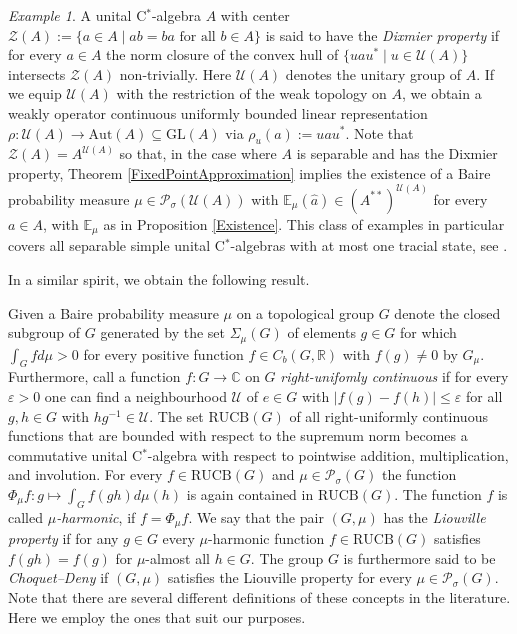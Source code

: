 \documentclass[a4paper,11pt,reqno]{amsart}
\numberwithin{equation}{section}
\theoremstyle{definition}
\theoremstyle{remark}
\newtheorem{example}[theorem]{Example}
\theoremstyle{remark}
\begin{document}
\begin{example} A unital C$^{\ast}$-algebra $A$ with center $\mathcal{Z}(A):=\{a\in A\mid ab=ba\text{ for all }b\in A\}$ is said to have the \emph{Dixmier property} if for every $a\in A$ the norm closure of the convex hull of $\{uau^{\ast}\mid u\in\mathcal{U}(A)\}$ intersects $\mathcal{Z}(A)$ non-trivially. Here $\mathcal{U}(A)$ denotes the unitary group of $A$. If we equip $\mathcal{U}(A)$ with the restriction of the weak topology on $A$, we obtain a weakly operator continuous uniformly bounded linear representation $\rho:\mathcal{U}(A)\rightarrow\text{Aut}(A)\subseteq\text{GL}(A)$ via $\rho_{u}(a):=uau^{\ast}$. Note that $\mathcal{Z}(A)=A^{\mathcal{U}(A)}$ so that, in the case where $A$ is separable and has the Dixmier property, Theorem \ref{FixedPointApproximation} implies the existence of a Baire probability measure $\mu\in\mathcal{P}_{\sigma}(\mathcal{U}(A))$ with $\mathbb{E}_{\mu}(\widehat{a})\in(A^{\ast\ast})^{\mathcal{U}(A)}$ for every $a\in A$, with $\mathbb{E}_{\mu}$ as in Proposition \ref{Existence}. This class of examples in particular covers all separable simple unital C$^{\ast}$-algebras with at most one tracial state, see \cite{HaagerupSzido}. \end{example}

In a similar spirit, we obtain the following result.

Given a Baire probability measure $\mu$ on a topological group $G$ denote the closed subgroup of $G$ generated by the set $\Sigma_{\mu}(G)$ of elements $g\in G$ for which $\int_{G}fd\mu>0$ for every positive function $f\in C_{b}(G,\mathbb{R})$ with $f(g)\neq0$ by $G_{\mu}$. Furthermore, call a function $f:G\rightarrow\mathbb{C}$ on $G$ \emph{right-unifomly continuous} if for every $\varepsilon>0$ one can find a neighbourhood $\mathcal{U}$ of $e\in G$ with $|f(g)-f(h)|\leq\varepsilon$ for all $g,h\in G$ with $hg^{-1}\in\mathcal{U}$. The set $\text{RUCB}(G)$ of all right-uniformly continuous functions that are bounded with respect to the supremum norm becomes a commutative unital C$^{\ast}$-algebra with respect to pointwise addition, multiplication, and involution. For every $f\in\text{RUCB}(G)$ and $\mu\in\mathcal{P}_{\sigma}(G)$ the function $\Phi_{\mu}f:g\mapsto\int_{G}f(gh)d\mu(h)$ is again contained in $\text{RUCB}(G)$. The function $f$ is called \emph{$\mu$-harmonic}, if $f=\Phi_{\mu}f$. We say that the pair $(G,\mu)$ has the \emph{Liouville property} if for any $g\in G$ every $\mu$-harmonic function $f\in\text{RUCB}(G)$ satisfies $f(gh)=f(g)$ for $\mu$-almost all $h\in G$. The group $G$ is furthermore said to be \emph{Choquet--Deny} if $(G,\mu)$ satisfies the Liouville property for every $\mu\in\mathcal{P}_{\sigma}(G)$. Note that there are several different definitions of these concepts in the literature. Here we employ the ones that suit our purposes.
\end{document}
